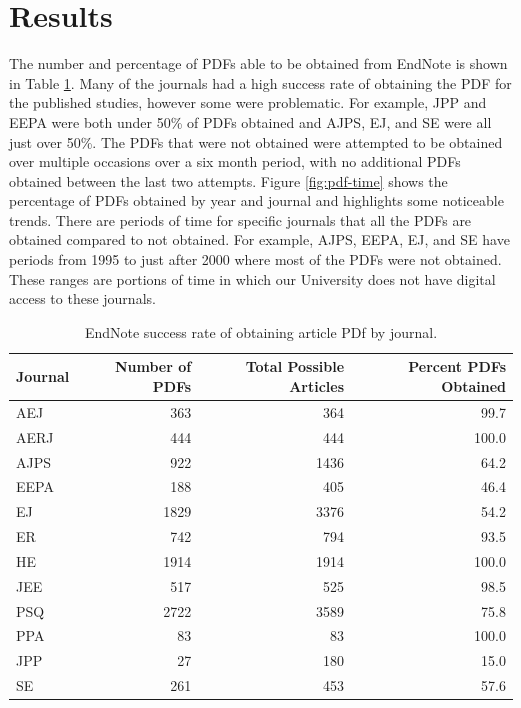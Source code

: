 \documentclass[english,,man]{apa6}
\theoremstyle{definition}
\theoremstyle{definition}
\theoremstyle{definition}
\theoremstyle{remark}
\begin{document}
\hypertarget{results}{%
\section{Results}\label{results}}

The number and percentage of PDFs able to be obtained from EndNote is
shown in Table \ref{tab:setup}. Many of the journals had a high success
rate of obtaining the PDF for the published studies, however some were
problematic. For example, JPP and EEPA were both under 50\% of PDFs
obtained and AJPS, EJ, and SE were all just over 50\%. The PDFs that
were not obtained were attempted to be obtained over multiple occasions
over a six month period, with no additional PDFs obtained between the
last two attempts. Figure \ref{fig:pdf-time} shows the percentage of
PDFs obtained by year and journal and highlights some noticeable trends.
There are periods of time for specific journals that all the PDFs are
obtained compared to not obtained. For example, AJPS, EEPA, EJ, and SE
have periods from 1995 to just after 2000 where most of the PDFs were
not obtained. These ranges are portions of time in which our University
does not have digital access to these journals.

\begin{table}[!h]

\caption{\label{tab:setup}EndNote success rate of obtaining article PDf by journal.}
\centering
\begin{tabular}[t]{lrrr}
\toprule
Journal & Number of PDFs & Total Possible Articles & Percent PDFs Obtained\\
\midrule
AEJ & 363 & 364 & 99.7\\
AERJ & 444 & 444 & 100.0\\
AJPS & 922 & 1436 & 64.2\\
EEPA & 188 & 405 & 46.4\\
EJ & 1829 & 3376 & 54.2\\
\addlinespace
ER & 742 & 794 & 93.5\\
HE & 1914 & 1914 & 100.0\\
JEE & 517 & 525 & 98.5\\
PSQ & 2722 & 3589 & 75.8\\
PPA & 83 & 83 & 100.0\\
\addlinespace
JPP & 27 & 180 & 15.0\\
SE & 261 & 453 & 57.6\\
\bottomrule
\end{tabular}
\end{table}
\end{document}
